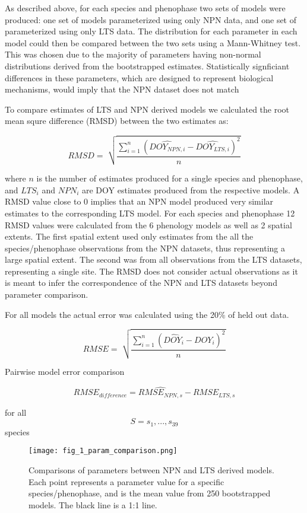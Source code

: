\documentclass[fleqn,10pt,lineno]{wlpeerj} %
\begin{document}
As described above, for each species and phenophase two sets of models were produced: one set of models parameterized using only NPN data, and one set of parameterized using only LTS data. The distribution for each parameter in each model could then be compared between the two sets using a Mann-Whitney test. This was chosen due to the majority of parameters having non-normal distributions derived from the bootstrapped estimates. Statistically signficiant differences in these parameters, which are designed to represent biological mechanisms, would imply that the NPN dataset does not match 


To compare estimates of LTS and NPN derived models we calculated the root mean squre difference (RMSD) between the two estimates as:

$$ RMSD = \sqrt[]{ \frac{\sum_{i=1}^{n}(\widehat{DOY_{NPN,i}} - \widehat{DOY_{LTS,i}})^{2}}{n}} $$

where $n$ is the number of estimates produced for a single species and phenophase, and $LTS_{i}$ and $NPN_{i}$ are DOY estimates produced from the respective models. A RMSD value close to 0 implies that an NPN model produced very similar estimates to the corresponding LTS model. For each species and phenophase 12 RMSD values were calculated from the 6 phenology models as well as 2 spatial extents. The first spatial extent used only estimates from the all the species/phenophase observations from the NPN datasets, thus representing a large spatial extent. The second was from all observations from the LTS datasets, representing a single site. The RMSD does not consider actual observations as it is meant to infer the correspondence of the NPN and LTS datasets beyond parameter comparison. 

For all models the actual error was calculated using the 20\% of held out data. 

$$ RMSE = \sqrt[]{ \frac{\sum_{i=1}^{n}(\widehat{DOY_{i}} - DOY_{i})^{2}}{n}} $$


Pairwise model error comparison

$$ RMSE_{difference} = \widehat{RMSE_{NPN,s}} - RMSE_{LTS,s} $$

for all $$S = s_{1},...,s_{39}$$ species

\begin{figure}[]
	\centering
		\texttt{[image: fig\_1\_param\_comparison.png]}
	\caption{Comparisons of parameters between NPN and LTS derived models. Each point represents a parameter value for a specific species/phenophase, and is the mean value from 250 bootstrapped  models. The black line is a 1:1 line.}
\end{figure}
\end{document}
